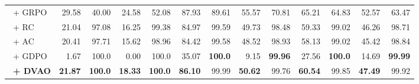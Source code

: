 \begin{table}[t!]
{\begin{tabular}{l rr rr rr rr rr rr}
    ~+ GRPO & 29.58 & 40.00 & 24.58 & 52.08 & 87.93 & 89.61 & 55.57 & 70.81 & 65.21 & 64.83 & 52.57 & 63.47 \\
    \addlinespace[0.1em]
    \hline
    \addlinespace[0.25em]
    ~+ RC & 21.04 & 97.08 & 16.25 & 99.38 & 84.97 & 99.59 & 49.73 & 98.48 & 59.33 & 99.02 & 46.26 & 98.71 \\
    ~+ AC & 20.41 & 97.71 & 15.62 & 98.96 & 84.42 & 99.58 & 48.52 & 98.93 & 58.13 & 99.02 & 45.42 & 98.84 \\
    ~+ GDPO & 1.67 & 100.0 & 0.00 & 100.0 & 35.07 & \textbf{100.0} & 9.15 & \textbf{99.96} & 27.56 & \textbf{100.0} & 14.69 & \textbf{99.99} \\
    \addlinespace[0.1em]
    \rowcolor{lightblue}
    ~\textbf{+ DVAO} & \textbf{21.87} & \textbf{100.0} & \textbf{18.33} & \textbf{100.0} & \textbf{86.10} & 99.99 & \textbf{50.62} & 99.76 & \textbf{60.54} & 99.85 & \textbf{47.49} & 99.92 \\
    \bottomrule
    \end{tabular}
    }
    \label{tab:main_math}
\end{table}